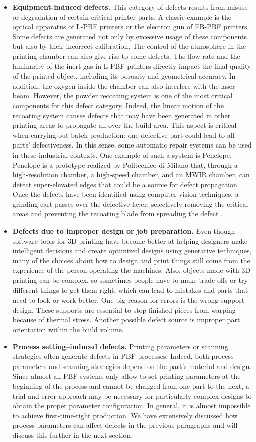 \begin{itemize}
    \item \textbf{Equipment-induced defects.} This category of defects results from misuse or degradation of certain critical printer parts. A classic example is the optical apparatus of L-PBF printers or the electron gun of EB-PBF printers. Some defects are generated not only by excessive usage of these components but also by their incorrect calibration. The control of the atmosphere in the printing chamber can also give rise to some defects. The flow rate and the laminarity of the inert gas in L-PBF printers directly impact the final quality of the printed object, including its porosity and geometrical accuracy. In addition, the oxygen inside the chamber can also interfere with the laser beam. However, the powder recoating system is one of the most critical components for this defect category. Indeed, the linear motion of the recoating system causes defects that may have been generated in other printing areas to propagate all over the build area. This aspect is critical when carrying out batch production: one defective part could lead to all parts' defectiveness. In this sense, some automatic repair systems can be used in these industrial contexts. One example of such a system is Penelope. Penelope is a prototype realized by Politecnico di Milano that, through a high-resolution chamber, a high-speed chamber, and an MWIR chamber, can detect super-elevated edges that could be a source for defect propagation. Once the defects have been identified using computer vision techniques, a grinding cart passes over the defective layer, selectively removing the critical areas and preventing the recoating blade from spreading the defect \cite{colosimo_penelope_2020}.
    \item \textbf{Defects due to improper design or job preparation.} Even though software tools for 3D printing have become better at helping designers make intelligent decisions and create optimized designs using generative techniques, many of the choices about how to design and print things still come from the experience of the person operating the machines. Also, objects made with 3D printing can be complex, so sometimes people have to make trade-offs or try different things to get them right, which can lead to mistakes and parts that need to look or work better. One big reason for errors is the wrong support design. These supports are essential to stop finished pieces from warping because of thermal stress. Another possible defect source is improper part orientation within the build volume. 
    \item \textbf{Process setting–induced defects.} Printing parameters or scanning strategies often generate defects in PBF processes. Indeed, both process parameters and scanning strategies depend on the part's material and design. Since almost all PBF systems only allow to set printing parameters at the beginning of the process and cannot be changed from one part to the next, a trial and error approach may be necessary for particularly complex designs to obtain the proper parameter configuration. In general, it is almost impossible to achieve first-time-right production. We have extensively discussed how process parameters can affect defects in the previous paragraphs and will discuss this further in the next section.

\end{itemize}
